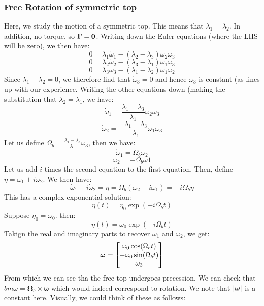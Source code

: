 \subsubsection{Free Rotation of symmetric top}
Here, we study the motion of a symmetric top. This means that $\lambda_1 = \lambda_2$. In addition, no torque, so $\bm{\Gamma} = \mathbf{0}$. Writing down the Euler equations (where the LHS will be zero), we then have:
\[0 = \lambda_1\dot{\omega}_1 - (\lambda_2 - \lambda_3)\omega_2\omega_3\]
\[0 = \lambda_2\dot{\omega}_2 - (\lambda_3 - \lambda_1)\omega_1\omega_3\]
\[0 = \lambda_3\dot{\omega}_3 - (\lambda_1 - \lambda_2)\omega_1\omega_2\]
Since $\lambda_1 - \lambda_2 = 0$, we therefore find that $\dot{\omega}_3 = 0$ and hence $\omega_3$ is constant (as lines up with our experience. Writing the other equations down (making the substitution that $\lambda_2 = \lambda_1$, we have:
\[\dot{\omega}_1 = \frac{\lambda_1 - \lambda_3}{\lambda_1}\omega_2\omega_3\]
\[\dot{\omega}_2 = -\frac{\lambda_1 - \lambda_3}{\lambda_1}\omega_1\omega_3\]
Let us define $\Omega_b = \frac{\lambda_1 - \lambda_3}{\lambda_1}\omega_3$, then we have:
\[\dot{\omega}_1 = \Omega_b\omega_2\]
\[\dot{\omega}_2 = -\Omega_b\omega1\]
Let us add $i$ times the second equation to the first equation. Then, define $\eta = \omega_1 + i\omega_2$. We then have:
\[\dot{\omega}_1 + i\dot{\omega}_2 = \dot{\eta} = \Omega_b(\omega_2 - i\omega_1) = -i\Omega_b\eta\]
This has a complex exponential solution:
\[\eta(t) = \eta_0\exp(-i\Omega_b t)\]
Suppose $\eta_0 = \omega_0$. then:
\[\eta(t) = \omega_0\exp(-i\Omega_b t)\]
Takign the real and imaginary parts to recover $\omega_1$ and $\omega_2$, we get:
\[\bm{\omega} = \begin{bmatrix}\omega_0\cos(\Omega_b t) \\ -\omega_0\sin(\Omega_b t) \\ \omega_3\end{bmatrix}\]
From which we can see tha the free top undergoes precession. We can check that $\dot{bm{\omega}} = \bm{\Omega}_b \times \bm{\omega}$ which would indeed correspond to rotation. We note that $\abs{\bm{\omega}}$ is a constant here. Visually, we could think of these as follows:
